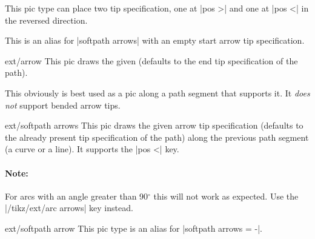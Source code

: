 \begin{multicols}{2}
\begin{description}
  This pic type can place two tip specification,
  one at |pos >| and one at |pos <| in the reversed direction.

\item[|ext/softpath arrow|]
  This is an alias for |softpath arrows| with an empty start arrow tip specification.

\end{description}
\begin{pictype}{ext/arrow}{}
  This pic draws the given 
  (defaults to the end tip specification of the path).
  
  
  This obviously is best used as a pic along a path segment that supports it.
  It \emph{does not} support bended arrow tips.
\begin{codeexample}[preamble=\usetikzlibrary{arrows.meta, bending, ext.arrows-plus}]
\end{codeexample}
\end{pictype}

\begin{pictype}{ext/softpath arrows}{}
  This pic draws the given arrow tip specification
  (defaults to the already present tip specification of the path)
  along the previous path segment (a curve or a line).
  It supports the |pos <| key.
  
  \paragraph{Note:} For arcs with an angle greater than 90${}^\circ$
    this will not work as expected. Use the |/tikz/ext/arc arrows| key instead.
\end{pictype}
\begin{pictype}{ext/softpath arrow}{}
  This pic type is an alias for |softpath arrows = -|.


\end{pictype}
\end{multicols}
